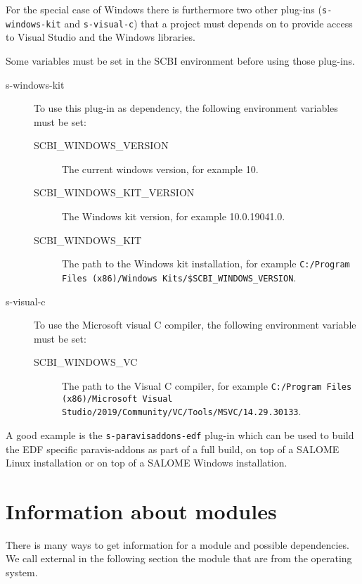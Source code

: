 \documentclass[a4paper,12pt,twoside]{article}
\newcommand{\code}[1]{\texttt{#1}}
\let\stdsection\section
\renewcommand\section{\newpage\stdsection}
\begin{document}
For the special case of Windows there is furthermore two other plug-ins (\code{s-windows-kit} and \code{s-visual-c}) that a project must depends on to provide access to Visual Studio and the Windows libraries.

Some variables must be set in the SCBI environment before using those plug-ins.

\begin{description}
	\item[s-windows-kit] To use this plug-in as dependency, the following environment variables must be set:
	\begin{description}
		\item[SCBI\_WINDOWS\_VERSION] The current windows version, for example 10.
		\item[SCBI\_WINDOWS\_KIT\_VERSION] The Windows kit version, for example 10.0.19041.0.
		\item[SCBI\_WINDOWS\_KIT] The path to the Windows kit installation, for example \code{C:/Program Files (x86)/Windows Kits/\$SCBI\_WINDOWS\_VERSION}.
	\end{description}

	\item[s-visual-c] To use the Microsoft visual C compiler, the following environment variable must be set:

	\begin{description}
	\item[SCBI\_WINDOWS\_VC] The path to the Visual C compiler, for example \code{C:/Program Files (x86)/Microsoft Visual Studio/2019/Community/VC/Tools/MSVC/14.29.30133}.
	\end{description}

\end{description}

A good example is the \code{s-paravisaddons-edf} plug-in which can be used to build the EDF specific paravis-addons as part of a full build, on top of a SALOME Linux installation or on top of a SALOME Windows installation.


\section{Information about modules}
\label{information}

There is many ways to get information for a module and possible dependencies. We call external in the following section the module that are from the operating system.
\end{document}
